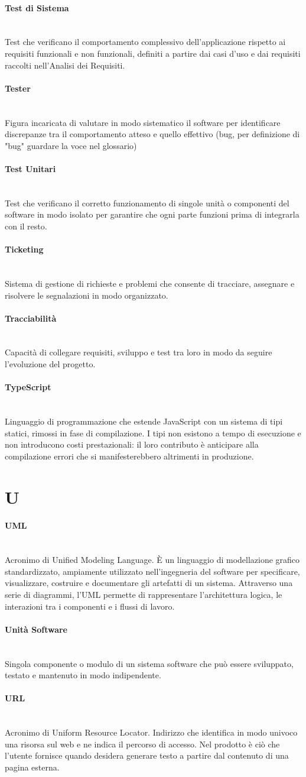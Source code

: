 \documentclass[a4paper, 10pt, colorlinks=true, linkcolor=black, urlcolor=blue, citecolor=blue, hidelinks]{article}
\newcommand{\glossaryterm}[2]{
    \paragraph{#1 \label{term:#1}} \mbox{} \\
    #2
    \vspace{0.5em}
}
\begin{document}
\glossaryterm{Test di Sistema}{Test che verificano il comportamento complessivo dell'applicazione rispetto ai requisiti funzionali e non funzionali, definiti a partire dai casi d'uso e dai requisiti raccolti nell'Analisi dei Requisiti.}

\glossaryterm{Tester}{Figura incaricata di valutare in modo sistematico il software per identificare discrepanze tra il comportamento atteso e quello effettivo (bug, per definizione di "bug" guardare la voce nel glossario)}

\glossaryterm{Test Unitari}{Test che verificano il corretto funzionamento di singole unità o componenti del software in modo isolato per garantire che ogni parte funzioni prima di integrarla con il resto.}

\glossaryterm{Ticketing}{Sistema di gestione di richieste e problemi che consente di tracciare, assegnare e risolvere le segnalazioni in modo organizzato.}

\glossaryterm{Tracciabilità}{Capacità di collegare requisiti, sviluppo e test tra loro in modo da seguire l'evoluzione del progetto.}

\glossaryterm{TypeScript}{Linguaggio di programmazione che estende JavaScript con un sistema di tipi statici, rimossi in fase di compilazione. I tipi non esistono a tempo di esecuzione e non introducono costi prestazionali: il loro contributo è anticipare alla compilazione errori che si manifesterebbero altrimenti in produzione.}

\newpage

\section*{U}

\glossaryterm{UML}{Acronimo di Unified Modeling Language. È un linguaggio di modellazione grafico standardizzato, ampiamente utilizzato nell'ingegneria del software per specificare, visualizzare, costruire e documentare gli artefatti di un sistema. Attraverso una serie di diagrammi, l'UML permette di rappresentare l'architettura logica, le interazioni tra i componenti e i flussi di lavoro.}

\glossaryterm{Unità Software}{Singola componente o modulo di un sistema software che può essere sviluppato, testato e mantenuto in modo indipendente.}

\glossaryterm{URL}{Acronimo di Uniform Resource Locator. Indirizzo che identifica in modo univoco una risorsa sul web e ne indica il percorso di accesso. Nel prodotto è ciò che l'utente fornisce quando desidera generare testo a partire dal contenuto di una pagina esterna.}
\end{document}
